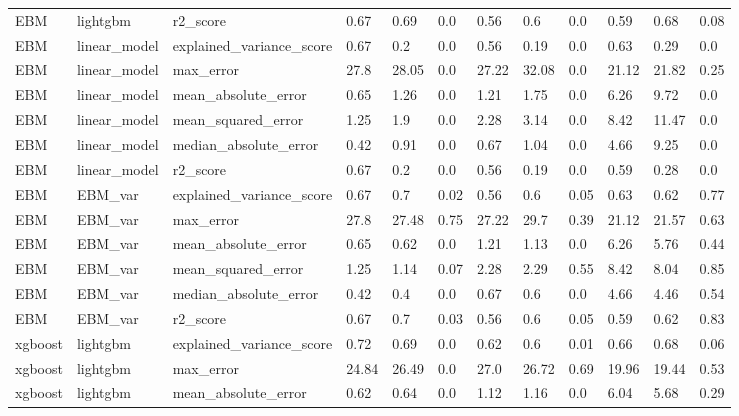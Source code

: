 \begin{table}[h!]
{\begin{tabular}{llllllllllll}
EBM           & lightgbm       & r2\_score                  & 0.67  & 0.69  & 0.0  & 0.56  & 0.6   & 0.0  & 0.59  & 0.68  & 0.08 \\
EBM           & linear\_model  & explained\_variance\_score & 0.67  & 0.2   & 0.0  & 0.56  & 0.19  & 0.0  & 0.63  & 0.29  & 0.0  \\
EBM           & linear\_model  & max\_error                 & 27.8  & 28.05 & 0.0  & 27.22 & 32.08 & 0.0  & 21.12 & 21.82 & 0.25 \\
EBM           & linear\_model  & mean\_absolute\_error      & 0.65  & 1.26  & 0.0  & 1.21  & 1.75  & 0.0  & 6.26  & 9.72  & 0.0  \\
EBM           & linear\_model  & mean\_squared\_error       & 1.25  & 1.9   & 0.0  & 2.28  & 3.14  & 0.0  & 8.42  & 11.47 & 0.0  \\
EBM           & linear\_model  & median\_absolute\_error    & 0.42  & 0.91  & 0.0  & 0.67  & 1.04  & 0.0  & 4.66  & 9.25  & 0.0  \\
EBM           & linear\_model  & r2\_score                  & 0.67  & 0.2   & 0.0  & 0.56  & 0.19  & 0.0  & 0.59  & 0.28  & 0.0  \\
EBM           & EBM\_var & explained\_variance\_score & 0.67  & 0.7   & 0.02 & 0.56  & 0.6   & 0.05 & 0.63  & 0.62  & 0.77 \\
EBM           & EBM\_var & max\_error                 & 27.8  & 27.48 & 0.75 & 27.22 & 29.7  & 0.39 & 21.12 & 21.57 & 0.63 \\
EBM           & EBM\_var & mean\_absolute\_error      & 0.65  & 0.62  & 0.0  & 1.21  & 1.13  & 0.0  & 6.26  & 5.76  & 0.44 \\
EBM           & EBM\_var & mean\_squared\_error       & 1.25  & 1.14  & 0.07 & 2.28  & 2.29  & 0.55 & 8.42  & 8.04  & 0.85 \\
EBM           & EBM\_var & median\_absolute\_error    & 0.42  & 0.4   & 0.0  & 0.67  & 0.6   & 0.0  & 4.66  & 4.46  & 0.54 \\
EBM           & EBM\_var & r2\_score                  & 0.67  & 0.7   & 0.03 & 0.56  & 0.6   & 0.05 & 0.59  & 0.62  & 0.83 \\
xgboost       & lightgbm       & explained\_variance\_score & 0.72  & 0.69  & 0.0  & 0.62  & 0.6   & 0.01 & 0.66  & 0.68  & 0.06 \\
xgboost       & lightgbm       & max\_error                 & 24.84 & 26.49 & 0.0  & 27.0  & 26.72 & 0.69 & 19.96 & 19.44 & 0.53 \\
xgboost       & lightgbm       & mean\_absolute\_error      & 0.62  & 0.64  & 0.0  & 1.12  & 1.16  & 0.0  & 6.04  & 5.68  & 0.29 \\

\end{tabular}}
\end{table}
